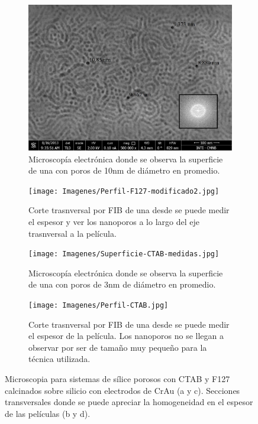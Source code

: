 			\begin{figure}[th]
		 	   	    \begin{subfigure}[t]{0.49\textwidth}
			        	\includegraphics[width=\textwidth]{Imagenes/Superficie-F127-medidas.jpg}
			       		\caption{Microscopía electrónica donde se observa la superficie de una \pdmF\space con poros de 10nm de diámetro en promedio.}
			       		\label{fig:sem_homogeneidad1}
			       		\end{subfigure}
					\begin{subfigure}[t]{0.49\textwidth}
			 	   	    \texttt{[image: Imagenes/Perfil-F127-modificado2.jpg]}
			       		\caption{Corte trasnversal por FIB de una \pdmF\space desde se puede medir el espesor y ver los nanoporos a lo largo del eje trasnversal a la película.}
			       		\label{fig:sem_homogeneidad2}
			       		\end{subfigure}
			       	\begin{subfigure}[t]{0.49\textwidth}
			        	\texttt{[image: Imagenes/Superficie-CTAB-medidas.jpg]}
			       		\caption{Microscopía electrónica donde se observa la superficie de una \pdmF\space con poros de 3nm de diámetro en promedio.}
			       		\label{fig:sem_homogeneidad3}
			       		\end{subfigure}
					\begin{subfigure}[t]{0.49\textwidth}
			 	   	    \texttt{[image: Imagenes/Perfil-CTAB.jpg]}
			       		\caption{Corte trasnversal por FIB de una \pdmC\space desde se puede medir el espesor de la película. Los nanoporos no se llegan a observar por ser de tamaño muy pequeño para la técnica utilizada.}
			       		\label{fig:sem_homogeneidad4}
			       		\end{subfigure}	
					 \caption[MEB \pdmC\space y \pdmF.]{Microscopia para sistemas de sílice porosos con CTAB y F127 calcinados sobre silicio con electrodos de Cr\textbar Au (a y c). Secciones transversales donde se puede apreciar la homogeneidad en el espesor de las películas (b y d).}
					 \label{fig:sem_homogeneidad}	
				     \end{figure}

